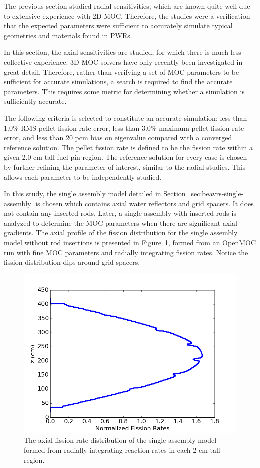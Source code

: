 The previous section studied radial sensitivities, which are known quite well due to extensive experience with 2D \ac{MOC}. Therefore, the studies were a verification that the expected parameters were sufficient to accurately simulate typical geometries and materials found in \acp{PWR}. 

In this section, the axial sensitivities are studied, for which there is much less collective experience. 3D \ac{MOC} solvers have only recently been investigated in great detail. Therefore, rather than verifying a set of \ac{MOC} parameters to be sufficient for accurate simulations, a search is required to find the accurate parameters. This requires some metric for determining whether a simulation is sufficiently accurate.

The following criteria is selected to constitute an accurate simulation: less than 1.0\% RMS pellet fission rate error, less than 3.0\% maximum pellet fission rate error, and less than 20 pcm bias on eigenvalue compared with a converged reference solution. The pellet fission rate is defined to be the fission rate within a given 2.0 cm tall fuel pin region. The reference solution for every case is chosen by further refining the parameter of interest, similar to the radial studies. This allows each parameter to be independently studied.

In this study, the single assembly model detailed in Section~\ref{sec:beavrs-single-assembly} is chosen which contains axial water reflectors and grid spacers. It does not contain any inserted rods. Later, a single assembly with inserted rods is analyzed to determine the \ac{MOC} parameters when there are significant axial gradients. The axial profile of the fission distribution for the single assembly model without rod insertions is presented in Figure~\ref{fig:single-assembly-axial}, formed from an OpenMOC run with fine \ac{MOC} parameters and radially integrating fission rates. Notice the fission distribution dips around grid spacers.

\begin{figure}[h!]
	\centering
	\includegraphics[width=0.7\linewidth]{figures/results/rr-plots/single-assembly-axial.png}
	\caption[]{The axial fission rate distribution of the single assembly model formed from radially integrating reaction rates in each 2 cm tall region.}
	\label{fig:single-assembly-axial}
\end{figure}

